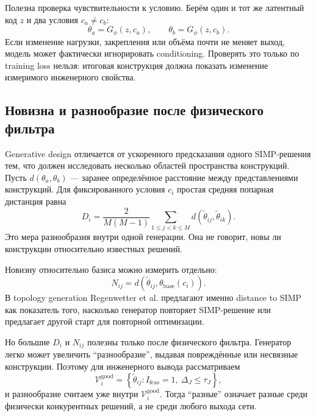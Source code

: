 Полезна проверка чувствительности к условию. Берём один и тот же латентный код $z$ и два условия $c_a\neq c_b$:
\begin{equation}
 \theta_a=G_\phi(z,c_a),
 \qquad
 \theta_b=G_\phi(z,c_b).
\end{equation}
Если изменение нагрузки, закрепления или объёма почти не меняет выход, модель может фактически игнорировать conditioning. Проверять это только по training loss нельзя: итоговая конструкция должна показать изменение измеримого инженерного свойства.

\subsection{Новизна и разнообразие после физического фильтра}

Generative design отличается от ускоренного предсказания одного SIMP-решения тем, что должен исследовать несколько областей пространства конструкций. Пусть $d(\theta_a,\theta_b)$ --- заранее определённое расстояние между представлениями конструкций. Для фиксированного условия $c_i$ простая средняя попарная дистанция равна
\begin{equation}
 D_i
 =
 \frac{2}{M(M-1)}
 \sum_{1\leq j<k\leq M}
 d(\widetilde\theta_{ij},\widetilde\theta_{ik}).
\end{equation}
Это мера разнообразия внутри одной генерации. Она не говорит, новы ли конструкции относительно известных решений.

Новизну относительно базиса можно измерить отдельно:
\begin{equation}
 N_{ij}
 =
 d\!\left(
  \widetilde\theta_{ij},
  \theta_{\mathrm{base}}(c_i)
 \right).
\end{equation}
В topology generation Regenwetter et al. предлагают именно distance to SIMP как показатель того, насколько генератор повторяет SIMP-решение или предлагает другой старт для повторной оптимизации.

Но большие $D_i$ и $N_{ij}$ полезны только после физического фильтра. Генератор легко может увеличить ``разнообразие'', выдавая повреждённые или несвязные конструкции. Поэтому для инженерного вывода рассматриваем
\begin{equation}
 \mathcal V_i^{\mathrm{good}}
 =
 \left\{
  \widetilde\theta_{ij}:
  I_{\mathrm{feas}}=1,
  \ \Delta_J\leq\tau_J
 \right\},
\end{equation}
и разнообразие считаем уже внутри $\mathcal V_i^{\mathrm{good}}$. Тогда ``разные'' означает разные среди физически конкурентных решений, а не среди любого выхода сети.

